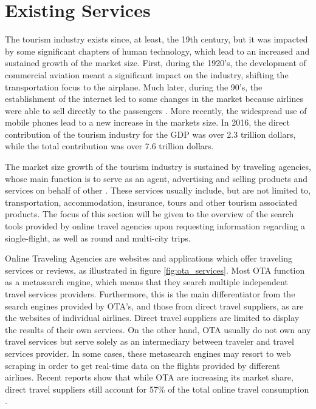 \section{Existing Services}

The tourism industry exists since, at least, the 19th century,
but it was impacted by some significant chapters of human technology, which lead to an increased and sustained growth of the market size. First, during the 1920's, the development of commercial aviation meant a significant impact on the industry, shifting the transportation focus to the airplane. Much later, during the 90's, the establishment of the internet led to some changes in the market because airlines were able to sell directly to the passengers \cite{tourism_tec}. More recently, the widespread use of mobile phones lead to a new increase in the markets size. In 2016, the direct contribution of the tourism industry for the GDP was over 2.3 trillion dollars, while the total contribution was over 7.6 trillion dollars\cite{travel_report}.

The market size growth of the tourism industry is sustained by traveling agencies, whose main function is to serve as an agent,  advertising and selling products and services on behalf of other \cite{book_tourism}. These services usually include, but are not limited to, transportation, accommodation, insurance, tours and other tourism associated products. The focus of this section will be given to the overview of the search tools provided by online travel agencies upon requesting information regarding a single-flight, as well as round and multi-city trips.   

Online Traveling Agencies are websites and applications which offer traveling services or reviews, as illustrated in figure \ref{fig:ota_services}. Most OTA function as a metasearch engine, which means that they search multiple independent travel services providers. Furthermore, this is the main differentiator from the search engines provided by OTA's, and those from direct travel suppliers, as are the websites of individual airlines. Direct travel suppliers are limited to display the results of their own services. On the other hand, OTA usually do not own any travel services but serve solely as an intermediary between traveler and travel services provider. In some cases, these metasearch engines may resort to web scraping in order to get real-time data on the flights provided by different airlines. Recent reports show that while OTA are increasing its market share, direct travel suppliers still account for 57\% of the total online travel consumption \cite{OTA_industry_report}.


